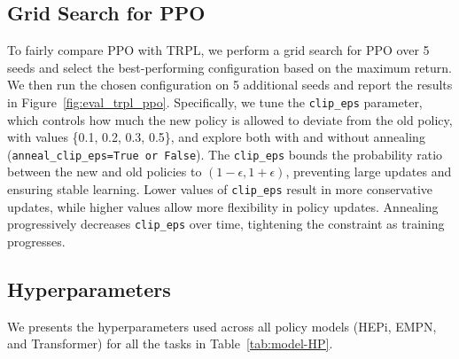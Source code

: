 \subsection{Grid Search for PPO}
\label{sec:appx_grid_search_ppo}

To fairly compare PPO with TRPL, we perform a grid search for PPO over 5 seeds and select the best-performing configuration based on the maximum return. We then run the chosen configuration on 5 additional seeds and report the results in Figure~\ref{fig:eval_trpl_ppo}. Specifically, we tune the \texttt{clip\_eps} parameter, which controls how much the new policy is allowed to deviate from the old policy, with values \{0.1, 0.2, 0.3, 0.5\}, and explore both with and without annealing (\texttt{anneal\_clip\_eps=True or False}). The \texttt{clip\_eps} bounds the probability ratio between the new and old policies to \((1 - \epsilon, 1 + \epsilon)\), preventing large updates and ensuring stable learning. Lower values of \texttt{clip\_eps} result in more conservative updates, while higher values allow more flexibility in policy updates. Annealing progressively decreases \texttt{clip\_eps} over time, tightening the constraint as training progresses.

\subsection{Hyperparameters}

We presents the hyperparameters used across all policy models (HEPi, EMPN, and Transformer) for all the tasks in Table~\ref{tab:model-HP}.

